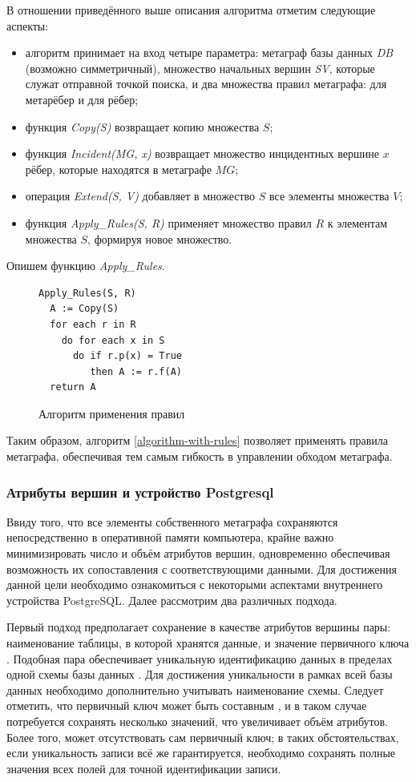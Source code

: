 В отношении приведённого выше описания алгоритма отметим следующие аспекты:
\begin{itemize}
  \item алгоритм принимает на вход четыре параметра: метаграф базы данных \textit{DB} (возможно симметричный), множество начальных вершин \textit{SV}, которые служат отправной точкой поиска, и два множества правил метаграфа: для метарёбер и для рёбер;
  \item функция \textit{Copy(S)} возвращает копию множества $S$;
  \item функция \textit{Incident(MG, x)} возвращает множество инцидентных вершине $x$ рёбер, которые находятся в метаграфе $MG$;
  \item операция \textit{Extend(S, V)} добавляет в множество $S$ все элементы множества $V$;
  \item функция \textit{Apply\_Rules(S, R)} применяет множество правил $R$ к элементам множества $S$, формируя новое множество.
\end{itemize}

Опишем функцию \textit{Apply\_Rules}.

\begin{figure}
  \begin{lstlisting}
Apply_Rules(S, R)
  A := Copy(S)
  for each r in R
    do for each x in S
      do if r.p(x) = True
         then A := r.f(A)
  return A
  \end{lstlisting}
  \caption{Алгоритм применения правил}
  \label{apply-rules}
\end{figure}

Таким образом, алгоритм \ref{algorithm-with-rules} позволяет применять правила метаграфа, обеспечивая тем самым гибкость в управлении обходом метаграфа.

\subsubsection{Атрибуты вершин и устройство Postgresql}
Ввиду того, что все элементы собственного метаграфа сохраняются непосредственно в оперативной памяти компьютера, крайне важно минимизировать число и объём атрибутов вершин, одновременно обеспечивая возможность их сопоставления с соответствующими данными. Для достижения данной цели необходимо ознакомиться с некоторыми аспектами внутреннего устройства PostgreSQL. Далее рассмотрим два различных подхода.

Первый подход предполагает сохранение в качестве атрибутов вершины пары: наименование таблицы, в которой хранятся данные, и значение первичного ключа \cite{pg-pk}. Подобная пара обеспечивает уникальную идентификацию данных в пределах одной схемы базы данных \cite{pg-schemas}. Для достижения уникальности в рамках всей базы данных необходимо дополнительно учитывать наименование схемы. Следует отметить, что первичный ключ может быть составным \cite{pg-pk-composite}, и в таком случае потребуется сохранять несколько значений, что увеличивает объём атрибутов. Более того, может отсутствовать сам первичный ключ; в таких обстоятельствах, если уникальность записи всё же гарантируется, необходимо сохранять полные значения всех полей для точной идентификации записи.

